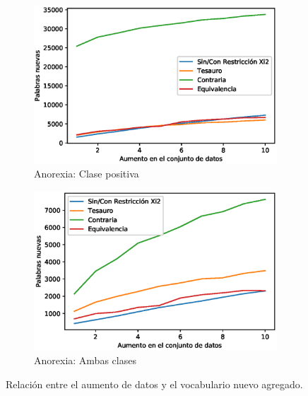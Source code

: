 \begin{figure}[hbt!]
    \begin{subfigure}[b]{0.5\textwidth}
        \includegraphics[width=\textwidth]{sections/figures/pos_anox.eps}
        \caption{Anorexia: Clase positiva}
    \end{subfigure}
    \hfill
    \begin{subfigure}[b]{0.5\textwidth}
        \includegraphics[width=\textwidth]{sections/figures/both_anox.eps}
        \caption{Anorexia: Ambas clases}
    \end{subfigure}
    
    
    \caption{Relación entre el aumento de datos y el vocabulario nuevo agregado.}
    \label{fig:aumento_vocab_dep}
\end{figure}